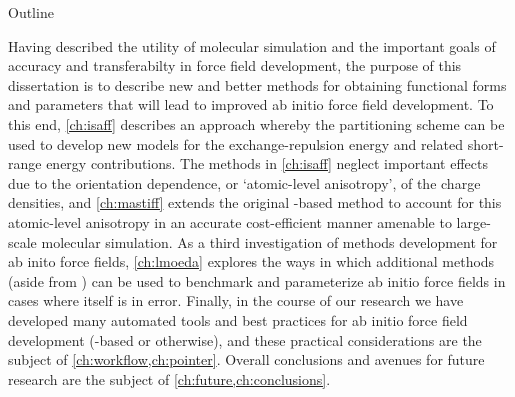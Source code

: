 \begin{section}{Outline}

Having described the utility of
molecular simulation and 
the important goals of accuracy and transferabilty in force field development,
the purpose of this dissertation is to describe new and better methods for
obtaining functional forms and parameters that will lead to improved ab initio force
field development. To this end,
\cref{ch:isaff} describes an approach whereby the \isa partitioning scheme can
be used to develop new models 
for the \sapt exchange-repulsion energy and related
short-range energy contributions. The methods in \cref{ch:isaff} neglect
important effects due to the orientation dependence, or `atomic-level
anisotropy', of the \isa charge densities, and \cref{ch:mastiff} extends the
original \isa-based method to account for this atomic-level anisotropy in an
accurate cost-efficient
manner amenable to large-scale molecular simulation.
As a third investigation of methods development for ab inito
force fields, \cref{ch:lmoeda} explores the ways in which additional \eda
methods (aside from \sapt) can be used to benchmark and parameterize ab initio
force fields in cases where \sapt itself is in error. Finally, in the course
of our research we have developed many automated tools and best practices for ab initio force 
field development (\sapt-based or otherwise), and these practical
considerations are the subject of \cref{ch:workflow,ch:pointer}. Overall
conclusions and avenues for future research are the subject of
\cref{ch:future,ch:conclusions}. 


\end{section}
